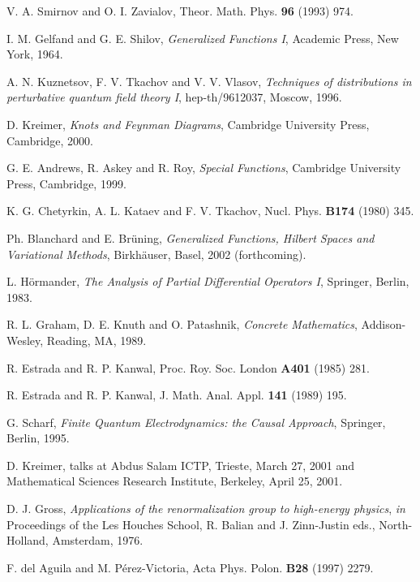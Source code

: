 \documentclass[a4paper,12pt]{article}
\newcommand{\7}{\dagger}           %
\theoremstyle{plain}
\theoremstyle{definition}
\begin{document}
\begin{thebibliography}{53}
V. A. Smirnov and O. I. Zavialov,
Theor. Math. Phys. {\bf 96} (1993) 974.

I. M. Gelfand and G. E. Shilov,
\textit{Generalized Functions I},
Academic Press, New York, 1964.

A. N. Kuznetsov, F. V. Tkachov and V. V. Vlasov,
\textsl{Techniques of distributions in perturbative
quantum field theory I},
hep-th/9612037, Moscow, 1996.

D. Kreimer,
\textit{Knots and Feynman Diagrams},
Cambridge University Press, Cambridge, 2000.

G. E. Andrews, R. Askey and R. Roy,
\textit{Special Functions},
Cambridge University Press, Cambridge, 1999.

K. G. Chetyrkin, A. L. Kataev and F. V. Tkachov,
Nucl. Phys. {\bf B174} (1980) 345.

Ph. Blanchard and E. Br\"uning,
\textit{Generalized Functions, Hilbert Spaces and Variational
Methods},
Birkh\"auser, Basel, 2002 (forthcoming).

L. H\"ormander,
\textit{The Analysis of Partial Differential Operators I},
Springer, Berlin, 1983.

R. L. Graham, D. E. Knuth and O. Patashnik,
\textit{Concrete Mathematics},
Addison-Wesley, Reading, MA, 1989.

R. Estrada and R. P. Kanwal,
Proc. Roy. Soc. London {\bf A401} (1985) 281.

R. Estrada and R. P. Kanwal,
J. Math. Anal. Appl. {\bf 141} (1989) 195.

G. Scharf,
\textit{Finite Quantum Electrodynamics: the Causal Approach},
Springer, Berlin, 1995.

D. Kreimer, talks at Abdus Salam ICTP, Trieste, March 27, 2001
and Mathematical Sciences Research Institute, Berkeley,
April 25, 2001.

D. J. Gross,
\textsl{Applications of the renormalization group to high-energy
physics},
\textit{in} Proceedings of the Les Houches School,
R. Balian and J. Zinn-Justin eds.,
North-Holland, Amsterdam, 1976.

F. del Aguila and M. P\'erez-Victoria,
Acta Phys. Polon. {\bf B28} (1997) 2279.


\end{thebibliography}
\end{document}
